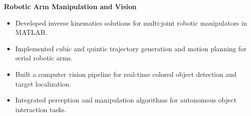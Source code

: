 \textbf{Robotic Arm Manipulation and Vision}
\begin{itemize}
  \item Developed inverse kinematics solutions for multi-joint robotic manipulators in MATLAB.
  \item Implemented cubic and quintic trajectory generation and motion planning for serial robotic arms.
  \item Built a computer vision pipeline for real-time colored object detection and target localization.
  \item Integrated perception and manipulation algorithms for autonomous object interaction tasks.
\end{itemize}
